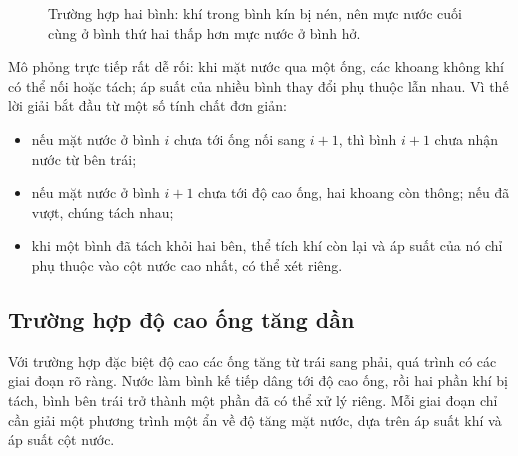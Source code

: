 \documentclass[11pt]{article}
\begin{document}
\begin{figure}[htbp]
\centering
{}
\caption{Trường hợp hai bình: khí trong bình kín bị nén, nên mực nước cuối cùng ở bình thứ hai thấp hơn mực nước ở bình hở.}
\end{figure}

Mô phỏng trực tiếp rất dễ rối: khi mặt nước qua một ống, các khoang không khí
có thể nối hoặc tách; áp suất của nhiều bình thay đổi phụ thuộc lẫn nhau. Vì
thế lời giải bắt đầu từ một số tính chất đơn giản:
\begin{itemize}
  \item nếu mặt nước ở bình \(i\) chưa tới ống nối sang \(i+1\), thì bình
  \(i+1\) chưa nhận nước từ bên trái;
  \item nếu mặt nước ở bình \(i+1\) chưa tới độ cao ống, hai khoang còn thông;
  nếu đã vượt, chúng tách nhau;
  \item khi một bình đã tách khỏi hai bên, thể tích khí còn lại và áp suất của
  nó chỉ phụ thuộc vào cột nước cao nhất, có thể xét riêng.
\end{itemize}

\subsection{Trường hợp độ cao ống tăng dần}

Với trường hợp đặc biệt độ cao các ống tăng từ trái sang phải, quá trình có
các giai đoạn rõ ràng. Nước làm bình kế tiếp dâng tới độ cao ống, rồi hai phần
khí bị tách, bình bên trái trở thành một phần đã có thể xử lý riêng. Mỗi giai
đoạn chỉ cần giải một phương trình một ẩn về độ tăng mặt nước, dựa trên áp suất
khí và áp suất cột nước.
\end{document}
